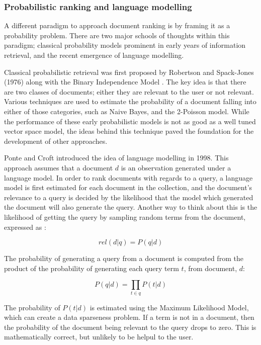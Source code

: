 \subsubsection{Probabilistic ranking and language modelling}

A different paradigm to approach document ranking is by framing it as a probability problem. There are two major schools of thoughts within this paradigm; classical probability models prominent in early years of information retrieval, and the recent emergence of language modelling. 

Classical probabilistic retrieval was first proposed by Robertson and Spack-Jones (1976) along with the Binary Independence Model \cite{robertson1976relevance}. The key idea is that there are two classes of documents; either they are relevant to the user or not relevant. Various techniques are used to estimate the probability of a document falling into either of those categories, such as Naive Bayes, and the 2-Poisson model. \cite{robertson1994some}
While the performance of these early probabilistic models is not as good as a well tuned vector space model, the ideas behind this technique paved the foundation for the development of other approaches.

Ponte and Croft introduced the idea of language modelling in 1998\cite{ponte1998language}. This approach assumes that a document $d$ is an observation generated under a language model. In order to rank documents with regards to a query, a language model is first estimated for each document in the collection, and the document's relevance to a query is decided by the likelihood that the model which generated the document will also generate the query. Another way to think about this is the likelihood of getting the query by sampling random terms from the document, expressed as :

\begin{equation}
rel(d|q) = P(q|d) 
\end{equation}

The probability of generating a query from a document is computed from the product of the probability of generating each query term $t$, from document, $d$:

\begin{equation}
P(q|d) = \prod_{t \in q} P(t|d)
\end{equation}

The probability of $P(t|d)$ is estimated using the Maximum Likelihood Model, which can create a data sparseness problem. If a term is not in a document, then the probability of the document being relevant to the query drops to zero. This is mathematically correct, but unlikely to be helpul to the user. 

